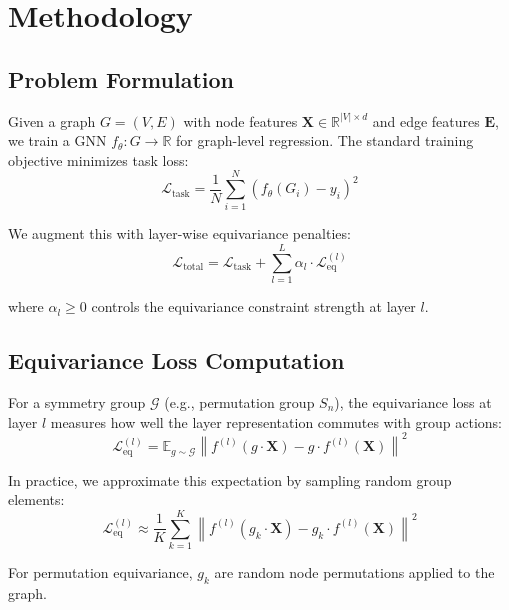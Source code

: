 \documentclass[11pt,a4paper]{article}
\begin{document}
\section{Methodology}

\subsection{Problem Formulation}

Given a graph $G = (V, E)$ with node features $\mathbf{X} \in \mathbb{R}^{|V| \times d}$ and edge features $\mathbf{E}$, we train a GNN $f_\theta: G \rightarrow \mathbb{R}$ for graph-level regression. The standard training objective minimizes task loss:
\begin{equation}
    \mathcal{L}_{\text{task}} = \frac{1}{N} \sum_{i=1}^{N} \left( f_\theta(G_i) - y_i \right)^2
\end{equation}

We augment this with layer-wise equivariance penalties:
\begin{equation}
    \mathcal{L}_{\text{total}} = \mathcal{L}_{\text{task}} + \sum_{l=1}^{L} \alpha_l \cdot \mathcal{L}_{\text{eq}}^{(l)}
    \label{eq:total_loss}
\end{equation}

where $\alpha_l \geq 0$ controls the equivariance constraint strength at layer $l$.

\subsection{Equivariance Loss Computation}

For a symmetry group $\mathcal{G}$ (e.g., permutation group $S_n$), the equivariance loss at layer $l$ measures how well the layer representation commutes with group actions:
\begin{equation}
    \mathcal{L}_{\text{eq}}^{(l)} = \mathbb{E}_{g \sim \mathcal{G}} \left\| f^{(l)}(g \cdot \mathbf{X}) - g \cdot f^{(l)}(\mathbf{X}) \right\|^2
\end{equation}

In practice, we approximate this expectation by sampling random group elements:
\begin{equation}
    \mathcal{L}_{\text{eq}}^{(l)} \approx \frac{1}{K} \sum_{k=1}^{K} \left\| f^{(l)}(g_k \cdot \mathbf{X}) - g_k \cdot f^{(l)}(\mathbf{X}) \right\|^2
\end{equation}

For permutation equivariance, $g_k$ are random node permutations applied to the graph.
\end{document}
